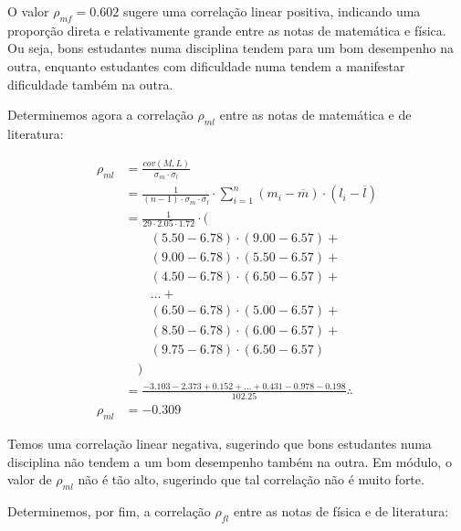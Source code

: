 \begin{sol}
O valor $\rho_{mf}=0.602$ sugere uma correlação linear positiva, indicando uma
proporção direta e relativamente grande entre as notas de matemática e física.
Ou seja, bons estudantes numa disciplina tendem para um bom desempenho na
outra, enquanto estudantes com dificuldade numa tendem a manifestar dificuldade
também na outra.

Determinemos agora a correlação $\rho_{ml}$ entre as notas de matemática e de
literatura:

\begin{align*}
    \rho_{ml} &=
        \frac{cov(M,L)}{\sigma_m \cdot \sigma_l} \\
    &= \frac{1}{(n-1) \cdot \sigma_m \cdot \sigma_l} \cdot
        \sum_{i=1}^{n} (m_i - \overline{m}) \cdot (l_i - \overline{l}) \\
    &= \frac{1}{29 \cdot 2.05 \cdot 1.72} \cdot \Big( \\
            & \quad \quad (5.50 - 6.78) \cdot (9.00 - 6.57) + \\
            & \quad \quad (9.00 - 6.78) \cdot (5.50 - 6.57) + \\
            & \quad \quad (4.50 - 6.78) \cdot (6.50 - 6.57) + \\
            & \quad \quad \ldots + \\
            & \quad \quad (6.50 - 6.78) \cdot (5.00 - 6.57) + \\
            & \quad \quad (8.50 - 6.78) \cdot (6.00 - 6.57) + \\
            & \quad \quad (9.75 - 6.78) \cdot (6.50 - 6.57) \\
            & \quad \Big) \\
    &= \frac{-3.103 -2.373 + 0.152 + \ldots + 0.431 -0.978 -0.198}{102.25} \therefore \\
    \rho_{ml} &= -0.309
\end{align*}

Temos uma correlação linear negativa, sugerindo que bons estudantes numa
disciplina não tendem a um bom desempenho também na outra. Em módulo, o valor
de $\rho_{ml}$ não é tão alto, sugerindo que tal correlação não é muito forte.

Determinemos, por fim, a correlação $\rho_{fl}$ entre as notas de física e de
literatura:


\end{sol}
